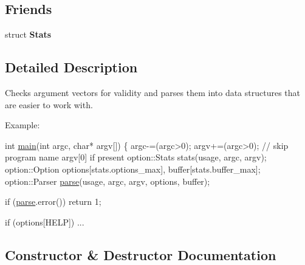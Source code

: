 \subsection*{Friends}
\begin{DoxyCompactItemize}
\item 
\hypertarget{classxmem_1_1config_1_1third__party_1_1_parser_a7183dc3501d1c87153f9c0d41f869460}{}struct {\bfseries Stats}\label{classxmem_1_1config_1_1third__party_1_1_parser_a7183dc3501d1c87153f9c0d41f869460}

\end{DoxyCompactItemize}


\subsection{Detailed Description}
Checks argument vectors for validity and parses them into data structures that are easier to work with. 

\begin{DoxyParagraph}{Example\+:}

\begin{DoxyCode}
\textcolor{keywordtype}{int} \hyperlink{main_8cpp_a0ddf1224851353fc92bfbff6f499fa97}{main}(\textcolor{keywordtype}{int} argc, \textcolor{keywordtype}{char}* argv[])
\{
  argc-=(argc>0); argv+=(argc>0); \textcolor{comment}{// skip program name argv[0] if present}
  option::Stats  stats(usage, argc, argv);
  option::Option options[stats.options\_max], buffer[stats.buffer\_max];
  option::Parser \hyperlink{classxmem_1_1config_1_1third__party_1_1_parser_a0e45d97675bc5d003ef6f68ac8cd7249}{parse}(usage, argc, argv, options, buffer);

  \textcolor{keywordflow}{if} (\hyperlink{classxmem_1_1config_1_1third__party_1_1_parser_a0e45d97675bc5d003ef6f68ac8cd7249}{parse}.error())
    \textcolor{keywordflow}{return} 1;

  \textcolor{keywordflow}{if} (options[HELP])
  ...
\end{DoxyCode}
 
\end{DoxyParagraph}


\subsection{Constructor \& Destructor Documentation}
\hypertarget{classxmem_1_1config_1_1third__party_1_1_parser_ab6131802b5bacfb921963abd183b5c85}{}

